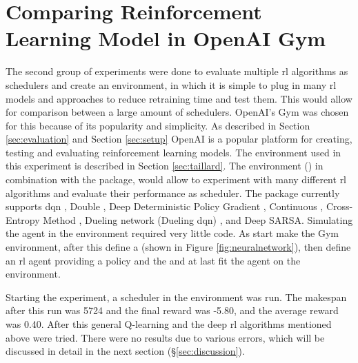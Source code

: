 


\section{Comparing Reinforcement Learning Model in OpenAI Gym}\label{exp:gym}

The second group of experiments were done to evaluate multiple \gls{rl} algorithms
as schedulers and create an environment, in which it is simple to plug in many
\gls{rl} models and approaches to reduce retraining time and test them. This would
allow for comparison between a large amount of schedulers. OpenAI's Gym was
chosen for this because of its popularity and simplicity. As described in
Section \ref{sec:evaluation} and Section \ref{sec:setup} OpenAI is a popular
platform for creating, testing and evaluating reinforcement learning models.
The environment used in this experiment is described in Section
\ref{sec:taillard}. The \jss environment () in combination with
the  package, would
allow to experiment with many different \gls{rl} algorithms and evaluate their
performance as scheduler. The  package currently supports
\acrfull{dqn} \cite{mnih2013}, Double \dqn \cite{hasselt2016}, Deep
Deterministic Policy Gradient \cite{lillicrap2015}, Continuous \dqn
\cite{gu2016}, Cross-Entropy Method \cite{szita2006}, Dueling network \dqn
(Dueling \gls{dqn}) \cite{wang2016}, and Deep SARSA. Simulating the agent in
the \jss environment required very little code. As start make the Gym
environment, after this define a \nn (shown in Figure
\ref{fig:neuralnetwork}), then define an \gls{rl} agent providing a policy and the
\nn and at last fit the agent on the environment.



Starting the experiment, a \fifo scheduler in the environment was run. The
makespan after this run was 5724 and the final reward was -5.80, and the
average reward was 0.40. After this general Q-learning and the deep \gls{rl}
algorithms mentioned above were tried. There were no results due to various
errors, which will be discussed in detail in the next section
(§\ref{sec:discussion}).
